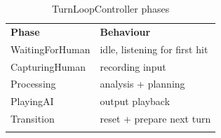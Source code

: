 \begin{longtable}[]{@{}
  >{\raggedright\arraybackslash}p{}
  >{\raggedright\arraybackslash}p{}@{}}
\caption{TurnLoopController phases}\label{tab:turn-loop-phases}\\
\toprule\noalign{}
\begin{minipage}[b]{\linewidth}\centering
\textbf{Phase}
\end{minipage} & \begin{minipage}[b]{\linewidth}\centering
\textbf{Behaviour}
\end{minipage} \\
\begin{minipage}[b]{\linewidth}\raggedright
WaitingForHuman
\end{minipage} & \begin{minipage}[b]{\linewidth}\raggedright
idle, listening for first hit
\end{minipage} \\
\begin{minipage}[b]{\linewidth}\raggedright
CapturingHuman
\end{minipage} & \begin{minipage}[b]{\linewidth}\raggedright
recording input
\end{minipage} \\
\begin{minipage}[b]{\linewidth}\raggedright
Processing
\end{minipage} & \begin{minipage}[b]{\linewidth}\raggedright
analysis + planning
\end{minipage} \\
\begin{minipage}[b]{\linewidth}\raggedright
PlayingAI
\end{minipage} & \begin{minipage}[b]{\linewidth}\raggedright
output playback
\end{minipage} \\
\begin{minipage}[b]{\linewidth}\raggedright
Transition
\end{minipage} & \begin{minipage}[b]{\linewidth}\raggedright
reset + prepare next turn
\end{minipage} \\
\midrule\noalign{}
\endhead
\bottomrule\noalign{}
\endlastfoot
\end{longtable}


